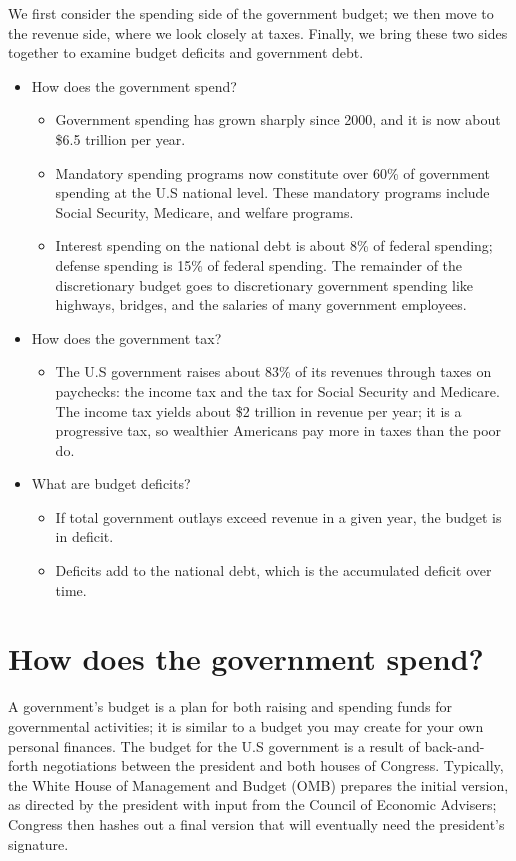 \documentclass[11pt]{article} %
\begin{document}
We first consider the spending side of the government budget; we then move to the revenue side, where we look closely at taxes. Finally, we bring these two sides together to examine budget deficits and government debt.
\begin{tcolorbox}[width=\textwidth,colback={white},title={Big Questions},colbacktitle=yellow,coltitle=blue]
\begin{itemize}
\item How does the government spend?
\begin{itemize}
\item Government spending has grown sharply since 2000, and it is now about \$6.5 trillion per year.
\item Mandatory spending programs now constitute over 60\% of government spending at the U.S national level. These mandatory programs include Social Security, Medicare, and welfare programs.
\item Interest spending on the national debt is about 8\% of federal spending; defense spending is 15\% of federal spending. The remainder of the discretionary budget goes to discretionary government spending like highways, bridges, and the salaries of many government employees.
\end{itemize}
\item How does the government tax?
\begin{itemize}
\item The U.S government raises about 83\% of its revenues through taxes on paychecks: the income tax and the tax for Social Security and Medicare. The income tax yields about \$2 trillion in revenue per year; it is a progressive tax, so wealthier Americans pay more in taxes than the poor do.
\end{itemize}
\item What are budget deficits?
\begin{itemize}
\item If total government outlays exceed revenue in a given year, the budget is in deficit.
\item Deficits add to the national debt, which is the accumulated deficit over time.
\end{itemize}
\end{itemize}
\end{tcolorbox}

\section*{How does the government spend?}
A government's budget is a plan for both raising and spending funds for governmental activities; it is similar to a budget you may create for your own personal finances. The budget for the U.S government is a result of back-and-forth negotiations between the president and both houses of Congress. Typically, the White House of Management and Budget (OMB) prepares the initial version, as directed by the president with input from the Council of Economic Advisers; Congress then hashes out a final version that will eventually need the president's signature.
\end{document}

